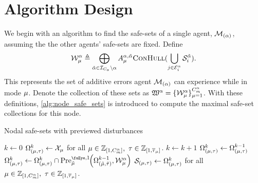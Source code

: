 \section{Algorithm Design}
We begin with an algorithm to find the safe-sets of a single agent, $\mathcal{M}_{(\alpha)}$, assuming the the other agents' safe-sets are fixed. Define 
\begin{equation}
\wcon[\agentidx][\modeidx]\triangleq\bigoplus_{\tilde{\agentidx}\in\idxset{\numagents}\setminus\agentidx}A_\modeidx^{\agentidx,\tilde{\agentidx}}\Call{ConHull}{\bigcup_{j\in\gnodeedges{i}^\agentidx}\mathcal{S}_i^{\tilde{\agentidx}}}.
\end{equation}
This represents the set of additive errors agent $\mathcal{M}_{(\alpha)}$ can experience while in mode ${\mu}$. Denote the collection of these sets as $\wconset{\agentidx}=\{\wcon[\agentidx][\modeidx]\}_{\modeidx=1}^{\nummodes[\agentidx]}$. With these definitions, \autoref{alg:node_safe_sets} is introduced to compute the maximal safe-set collections for this node. 
\begin{algorithm}[t]
\caption{Nodal safe-sets with previewed disturbances}\label{alg:node_safe_sets}
\begin{algorithmic}[1]
\State $k\gets0$
\State $\Omega_{(\modeidx,\sstimerval)}^k\gets\xcon[\modeidx]$ for all $\modeidx\in\int\rii{1}{\nummodes[\agentidx]},\ \sstimerval\in\int\rii{1}{\sstimermax{\modeidx}}$.
\Repeat 
	\State $k\gets k+1$
			\State $\Omega_{({\mu},\tau)}^k\gets\Omega_{({\mu},\tau)}^{k-1}$
			\For{$(\tilde{\modeidx},\tilde{\sstimerval})\in\sspairset{\modeidx}{\sstimerval}$}
				\State $\Omega_{(\modeidx,\sstimerval)}^k\gets\Omega_{(\modeidx,\sstimerval)}^k\cap\PreviewedPre[\tilde{\modeidx}][1]{\Omega_{(\tilde{\modeidx},\tilde{\sstimerval})}^{k-1}, \wcon[\agentidx][\modeidx]}$
			\EndFor
		\EndFor
	\EndFor
{}
$\mathcal{S}_{({\mu},\tau)}\gets\Omega_{({\mu},\tau)}^k$ for all $\modeidx\in\int\rii{1}{\nummodes[\agentidx]},\ \sstimerval\in\int\rii{1}{\sstimermax{\modeidx}}$.\;
\EndProcedure
\end{algorithmic}
\end{algorithm}

